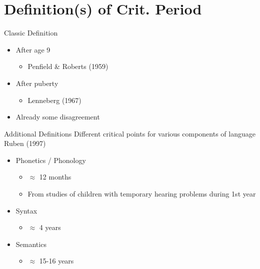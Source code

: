 \documentclass{beamer}
\begin{document}
\section{Definition(s) of Crit. Period}

\begin{frame}{Classic Definition}
  \begin{itemize}
    \item After age 9
    \begin{itemize}
      \item Penfield \& Roberts (1959)
    \end{itemize}
    \item After puberty
    \begin{itemize}
      \item Lenneberg (1967)
    \end{itemize}
    \item Already some disagreement
  \end{itemize}
\end{frame}

\begin{frame}{Additional Definitions}
  Different critical points for various components of language \\
  Ruben (1997)
  \begin{itemize}
    \item Phonetics / Phonology
    \begin{itemize}
      \item $\approx$ 12 months
      \item From studies of children with temporary hearing problems during 1st year
    \end{itemize}
    \item Syntax
    \begin{itemize}
      \item $\approx$ 4 years
    \end{itemize}
    \item Semantics
    \begin{itemize}
      \item $\approx$ 15-16 years
    \end{itemize}
  \end{itemize}
\end{frame}
\end{document}

